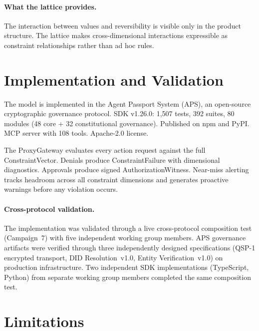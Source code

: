 \documentclass[sigconf,nonacm]{acmart}
\begin{document}
\paragraph{What the lattice provides.} The interaction between values and reversibility
is visible only in the product structure. The lattice makes cross-dimensional interactions
expressible as constraint relationships rather than ad hoc rules.

\section{Implementation and Validation}

The model is implemented in the Agent Passport System (APS), an open-source cryptographic
governance protocol. SDK v1.26.0: 1,507 tests, 392 suites, 80 modules (48 core + 32
constitutional governance). Published on npm and PyPI. MCP server with 108 tools.
Apache-2.0 license.

The ProxyGateway evaluates every action request against the full ConstraintVector.
Denials produce ConstraintFailure with dimensional diagnostics. Approvals produce
signed AuthorizationWitness. Near-miss alerting tracks headroom across all constraint
dimensions and generates proactive warnings before any violation occurs.

\paragraph{Cross-protocol validation.} The implementation was validated through a live
cross-protocol composition test (Campaign~7) with five independent working group members.
APS governance artifacts were verified through three independently designed specifications
(QSP-1 encrypted transport, DID Resolution~v1.0, Entity Verification~v1.0) on production
infrastructure. Two independent SDK implementations (TypeScript, Python) from separate
working group members completed the same composition test.

\section{Limitations}
\end{document}
